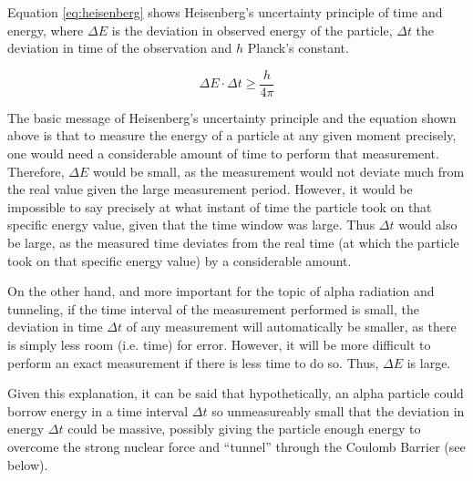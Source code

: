 Equation \ref{eq:heisenberg} shows Heisenberg's uncertainty principle of time and energy, where $\Delta E$ is the deviation in observed energy of the particle, $\Delta t$ the deviation in time of the observation and $h$ Planck's constant. 

\begin{equation}
  \Delta E \cdot \Delta t \geq \frac{h}{4\pi}
  \label{eq:heisenberg}
\end{equation}

The basic message of Heisenberg's uncertainty principle and the equation shown above is that to measure the energy of a particle at any given moment precisely, one would need a considerable amount of time to perform that measurement. Therefore, $\Delta E$ would be small, as the measurement would not deviate much from the real value given the large measurement period. However, it would be impossible to say precisely at what instant of time the particle took on that specific energy value, given that the time window was large. Thus $\Delta t$ would also be large, as the measured time deviates from the real time (at which the particle took on that specific energy value) by a considerable amount.

On the other hand, and more important for the topic of alpha radiation and tunneling, if the time interval of the measurement performed is small, the deviation in time $\Delta t$ of any measurement will automatically be smaller, as there is simply less room (i.e. time) for error. However, it will be more difficult to perform an exact measurement if there is less time to do so. Thus, $\Delta E$ is large. 

Given this explanation, it can be said that hypothetically, an alpha particle could borrow energy in a time interval $\Delta t$ so unmeasureably small that the deviation in energy $\Delta t$ could be massive, possibly giving the particle enough energy to overcome the strong nuclear force and ``tunnel'' through the Coulomb Barrier (see below).

